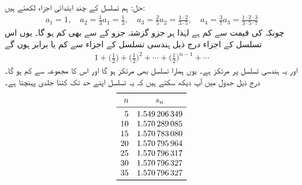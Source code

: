 حل:\quad
ہم تسلسل کے چند ابتدائی اجزاء لکھتے ہیں:
\begin{align*}
a_1=1,\quad a_2=\frac{1}{3}a_1=\frac{1}{3},\quad a_3=\frac{2}{5}a_2=\frac{1\cdot 2}{3\cdot 5},\quad a_4=\frac{3}{7}a_3=\frac{1\cdot 2\cdot 3}{3\cdot 5\cdot 7}
\end{align*}
چونکہ  کی قیمت  سے کم ہے لہٰذا ہر جزو گزشتہ جزو کے  سے بھی کم ہو گا۔ یوں اس  تسلسل کے اجزاء درج ذیل ہندسی تسلسل کے اجزاء سے کم یا برابر ہوں گے
\begin{align*}
1+\big(\frac{1}{2}\big)+\big(\frac{1}{2}\big)^2+\cdots+\big(\frac{1}{2}\big)^{n-1}+\cdots
\end{align*}
 اور یہ ہندسی تسلسل  پر مرتکز ہے۔ یوں ہمارا تسلسل بھی مرتکز ہو گا اور اس کا مجموعہ  سے کم ہو گا۔درج ذیل جدول میں آپ دیکھ سکتے ہیں کہ یہ تسلسل اپنے حد  تک کتنا جلدی پہنچتا ہے۔
\begin{align*}
\begin{array}{rc}
\toprule
n&s_n\\
\midrule
5&\num{1.549206349}\\
10&\num{1.570289085}\\
15&\num{1.570783080}\\
20&\num{1.570795964}\\
25&\num{1.570796317}\\
30&\num{1.570796327}\\
35&\num{1.570796327}\\
\bottomrule
\end{array}
\end{align*}

